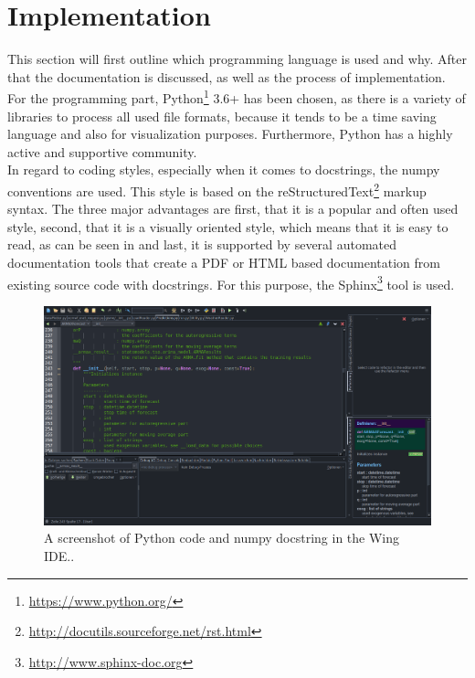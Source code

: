 \section{Implementation}
\label{sec:prog}

This section will first outline which programming language is used and why. After that the documentation is discussed, as well as the process of implementation.\\

For the programming part, Python\footnote{\url{https://www.python.org/}} 3.6+ has been chosen, as there is a variety of libraries to process all used file formats, because it tends to be a time saving language and also for visualization purposes. Furthermore, Python has a highly active and supportive community.\\

In regard to coding styles, especially when it comes to docstrings, the numpy conventions are used. This style is based on the reStructuredText\footnote{\url{http://docutils.sourceforge.net/rst.html}} markup syntax. The three major advantages are first, that it is a popular and often used style, second, that it is a visually oriented style, which means that it is easy to read, as can be seen in  and last, it is supported by several automated documentation tools that create a PDF or HTML based documentation from existing source code with docstrings. For this purpose, the Sphinx\footnote{\url{http://www.sphinx-doc.org}} tool is used.\\

\begin{figure}[h!]%
\centering
\includegraphics[width=\textwidth]{logos/Predictions_Wing_001}%
\caption[A screenshot of Python code and numpy docstring in the Wing IDE.]{A screenshot of Python code and numpy docstring in the Wing IDE.\footnotemark.}%
\label{fig:wing_docstrings}%
\end{figure}

